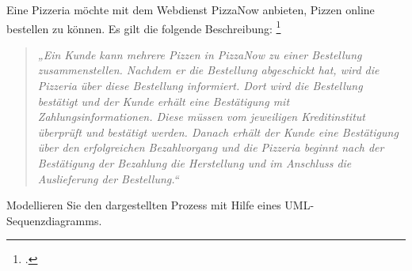 \documentclass{bschlangaul-aufgabe}
\begin{document}

Eine Pizzeria möchte mit dem Webdienst PizzaNow anbieten, Pizzen online
bestellen zu können. Es gilt die folgende Beschreibung:
\footcite{examen:66116:2019:03}

\begin{quote}
\itshape
„Ein Kunde kann mehrere Pizzen in PizzaNow zu einer Bestellung
zusammenstellen. Nachdem er die Bestellung abgeschickt hat, wird die
Pizzeria über diese Bestellung informiert. Dort wird die Bestellung
bestätigt und der Kunde erhält eine Bestätigung mit
Zahlungsinformationen. Diese müssen vom jeweiligen Kreditinstitut
überprüft und bestätigt werden. Danach erhält der Kunde eine Bestätigung
über den erfolgreichen Bezahlvorgang und die Pizzeria beginnt nach der
Bestätigung der Bezahlung die Herstellung und im Anschluss die
Auslieferung der Bestellung.“
\end{quote}

Modellieren Sie den dargestellten Prozess mit Hilfe eines
UML-Sequenzdiagramms.
\end{document}
